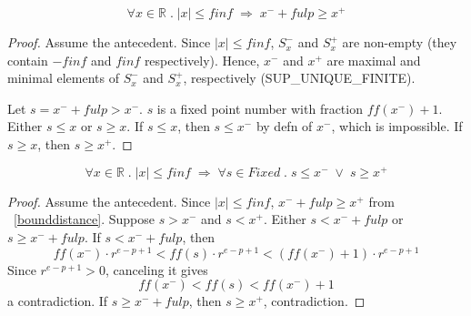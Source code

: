 \documentclass{article}
\begin{document}
\begin{lem}
\label{bounddistance}
\begin{equation*}
\forall x \in \mathbb{R} \; . \; |x| \leq finf \;
\Longrightarrow \; x^- + fulp \geq x^+
\end{equation*}
\begin{proof} Assume the antecedent. Since $|x| \leq finf$, $S_x^-$ and
$S_x^+$ are non-empty (they contain $-finf$ and $finf$ respectively).
Hence, $x^-$ and $x^+$ are maximal and minimal elements of $S_x^-$ and
$S_x^+$, respectively (SUP\_UNIQUE\_FINITE).

Let $s = x^- + fulp > x^-$. $s$ is a fixed point number with fraction
$ff(x^-) + 1$. Either $s \leq x$ or $s \geq x$. If $s \leq x$, then
$s \leq x^-$ by defn of $x^-$, which is impossible. If $s \geq x$, then
$s \geq x^+$.
\end{proof}
\end{lem}

\begin{lem}
\label{boundbetw}
\begin{equation*}
\forall x \in \mathbb{R} \; . \; |x| \leq finf \;
\Longrightarrow \; 
\forall s \in Fixed \; . \; s \leq x^- \; \vee \; s \geq x^+
\end{equation*}
\begin{proof} Assume the antecedent. Since $|x| \leq finf$,
$x^- + fulp \geq x^+$ from ~\ref{bounddistance}. Suppose
$s > x^-$ and $s < x^+$. Either $s < x^- + fulp$ or $s \geq x^- + fulp$.
If $s < x^- + fulp$, then
\begin{equation*}
ff(x^-) \cdot r^{e - p + 1} < ff(s) \cdot r^{e - p + 1} < (ff(x^-) + 1) \cdot
r^{e - p + 1}
\end{equation*}
Since $r^{e - p + 1} > 0$, canceling it gives
\begin{equation*}
ff(x^-) < ff(s) < ff(x^-) + 1
\end{equation*}
a contradiction. If $s \geq x^- + fulp$, then $s \geq x^+$, contradiction.
\end{proof}
\end{lem}
\end{document}
